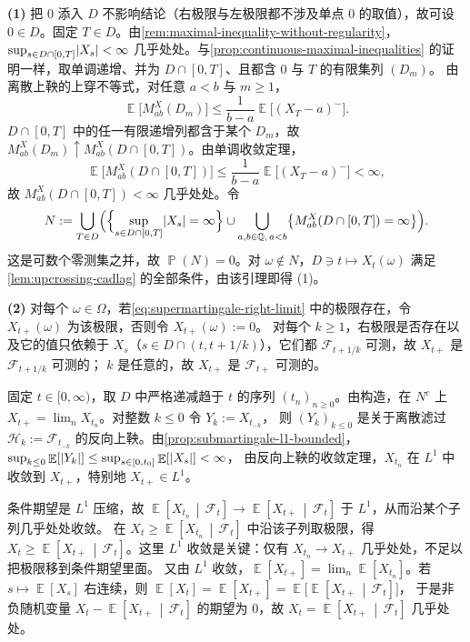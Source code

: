 \documentclass[UTF8,11pt,a4paper,oneside,fontset=fandol]{ctexrep}
\makeatletter
\numberwithin{equation}{section}
\theoremstyle{zhthm}
\renewenvironment{proof}[1][\proofname]{\par
  \pushQED{\qed}%
  \normalfont\topsep6\p@\@plus6\p@\relax
  \trivlist
  \item[\hskip\labelsep\bfseries#1\hspace{0.5em}]\ignorespaces
}{%
  \popQED\endtrivlist\@endpefalse
}
\renewcommand{\proofname}{证明}
\newcommand{\Q}{\mathbb{Q}}
\newcommand{\F}{\mathcal{F}}
\DeclareMathOperator{\Prob}{\mathbb{P}}
\DeclareMathOperator{\E}{\mathbb{E}}
\newcommand{\Econd}[2]{%
  \E\!\left[#1\,\middle|\,#2\right]}
\DeclarePairedDelimiter{\abs}{\lvert}{\rvert}
\makeatother
\begin{document}
\begin{proof}
\textbf{(1)} 把 $0$ 添入 $D$ 不影响结论（右极限与左极限都不涉及单点 $0$ 的取值），故可设 $0\in D$。固定 $T\in D$。由\cref{rem:maximal-inequality-without-regularity}，
$\sup_{s\in D\cap[0,T]}\abs{X_s}<\infty$ 几乎处处。与\cref{prop:continuous-maximal-inequalities} 的证明一样，取单调递增、并为 $D\cap[0,T]$、且都含 $0$ 与 $T$ 的有限集列 $(D_m)$。
由离散上鞅的上穿不等式\cite[附录 A2]{LeGall2016}，对任意 $a<b$ 与 $m\ge1$，
\[
  \E\bigl[M^X_{ab}(D_m)\bigr]\le\frac{1}{b-a}\E\bigl[(X_T-a)^-\bigr].
\]
$D\cap[0,T]$ 中的任一有限递增列都含于某个 $D_m$，故 $M^X_{ab}(D_m)\uparrow M^X_{ab}(D\cap[0,T])$。由单调收敛定理，
\[
  \E\bigl[M^X_{ab}(D\cap[0,T])\bigr]\le\frac{1}{b-a}\E\bigl[(X_T-a)^-\bigr]<\infty,
\]
故 $M^X_{ab}(D\cap[0,T])<\infty$ 几乎处处。令
\begin{equation}
  \label{eq:supermartingale-null-set}
  N:=\bigcup_{T\in D}\Bigl(\Bigl\{\sup_{s\in D\cap[0,T]}\abs{X_s}=\infty\Bigr\}\cup\bigcup_{a,b\in\Q,\,a<b}\bigl\{M^X_{ab}(D\cap[0,T])=\infty\bigr\}\Bigr).
\end{equation}
这是可数个零测集之并，故 $\Prob(N)=0$。对 $\omega\notin N$，$D\ni t\mapsto X_t(\omega)$ 满足\cref{lem:upcrossing-cadlag} 的全部条件，由该引理即得 (1)。

\textbf{(2)} 对每个 $\omega\in\Omega$，若\cref{eq:supermartingale-right-limit} 中的极限存在，令 $X_{t+}(\omega)$ 为该极限，否则令 $X_{t+}(\omega):=0$。
对每个 $k\ge1$，右极限是否存在以及它的值只依赖于 $X_s$（$s\in D\cap(t,t+1/k)$），它们都 $\F_{t+1/k}$ 可测，故 $X_{t+}$ 是 $\F_{t+1/k}$ 可测的；
$k$ 是任意的，故 $X_{t+}$ 是 $\F_{t+}$ 可测的。

固定 $t\in[0,\infty)$，取 $D$ 中严格递减趋于 $t$ 的序列 $(t_n)_{n\ge0}$。由构造，在 $N^c$ 上 $X_{t+}=\lim_nX_{t_n}$。对整数 $k\le0$ 令 $Y_k:=X_{t_{-k}}$，
则 $(Y_k)_{k\le0}$ 是关于离散滤过 $\mathcal H_k:=\F_{t_{-k}}$ 的反向上鞅。由\cref{prop:submartingale-l1-bounded}，$\sup_{k\le0}\E[\abs{Y_k}]\le\sup_{s\in[0,t_0]}\E[\abs{X_s}]<\infty$，
由反向上鞅的收敛定理\cite[附录 A2]{LeGall2016}，$X_{t_n}$ 在 $L^1$ 中收敛到 $X_{t+}$，特别地 $X_{t+}\in L^1$。

条件期望是 $L^1$ 压缩\cite[定理 4.1.11]{Durrett2019}，故 $\Econd{X_{t_n}}{\F_t}\to\Econd{X_{t+}}{\F_t}$ 于 $L^1$，从而沿某个子列几乎处处收敛\cite[定理 2.3.2]{Durrett2019}。
在 $X_t\ge\Econd{X_{t_n}}{\F_t}$ 中沿该子列取极限，得 $X_t\ge\Econd{X_{t+}}{\F_t}$。这里 $L^1$ 收敛是关键：仅有 $X_{t_n}\to X_{t+}$ 几乎处处，不足以把极限移到条件期望里面。
又由 $L^1$ 收敛，$\E[X_{t+}]=\lim_n\E[X_{t_n}]$。若 $s\mapsto\E[X_s]$ 右连续，则 $\E[X_t]=\E[X_{t+}]=\E\bigl[\Econd{X_{t+}}{\F_t}\bigr]$，
于是非负随机变量 $X_t-\Econd{X_{t+}}{\F_t}$ 的期望为 $0$，故 $X_t=\Econd{X_{t+}}{\F_t}$ 几乎处处。


\end{proof}
\end{document}
